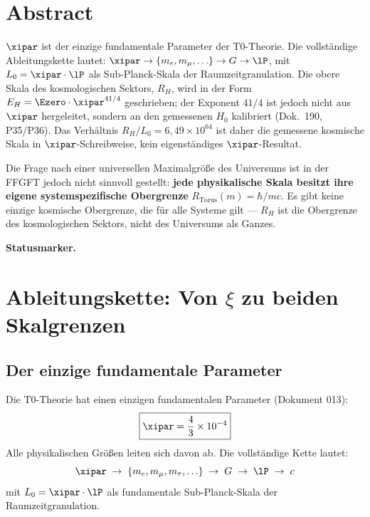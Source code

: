 \section*{Abstract}

$\xipar$ ist der einzige fundamentale Parameter der T0-Theorie. Die vollständige Ableitungskette lautet: $\xipar \to \{m_e, m_\mu, \ldots\} \to G \to \lP$, mit $L_0 = \xipar \cdot \lP$ als Sub-Planck-Skala der Raumzeitgranulation. Die obere Skala des kosmologischen Sektors, $R_H$, wird in der Form $E_H = \Ezero \cdot \xipar^{41/4}$ geschrieben; der Exponent $41/4$ ist jedoch nicht aus $\xipar$ hergeleitet, sondern an den gemessenen $H_0$ kalibriert (Dok.~190, P35/P36). Das Verhältnis $R_H/L_0 = 6{,}49 \times 10^{64}$ ist daher die gemessene kosmische Skala in $\xipar$-Schreibweise, kein eigenständiges $\xipar$-Resultat.

Die Frage nach einer universellen Maximalgröße des Universums ist in der FFGFT jedoch nicht sinnvoll gestellt: \textbf{jede physikalische Skala besitzt ihre eigene systemspezifische Obergrenze} $R_\text{Torus}(m) = \hbar/mc$. Es gibt keine einzige kosmische Obergrenze, die für alle Systeme gilt — $R_H$ ist die Obergrenze des kosmologischen Sektors, nicht des Universums als Ganzes.

\medskip\noindent\textbf{Statusmarker.}


\section{Ableitungskette: Von \texorpdfstring{$\xi$}{xi} zu beiden Skalgrenzen}

\subsection{Der einzige fundamentale Parameter}

Die T0-Theorie hat einen einzigen fundamentalen Parameter (Dokument 013):
\begin{equation}
	\boxed{\xipar = \frac{4}{3} \times 10^{-4}}
\end{equation}
Alle physikalischen Größen leiten sich davon ab. Die vollständige Kette lautet:
\begin{equation}
	\xipar \;\to\; \{m_e, m_\mu, m_\tau, \ldots\} \;\to\; G \;\to\; \lP \;\to\; c
\end{equation}
mit $L_0 = \xipar \cdot \lP$ als fundamentale Sub-Planck-Skala der Raumzeitgranulation.

